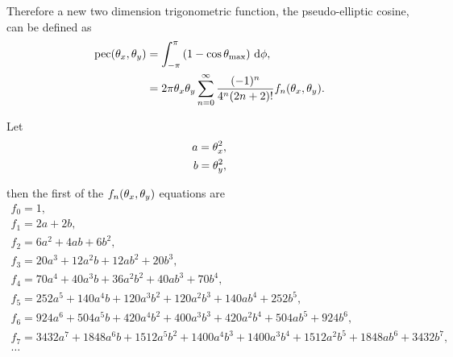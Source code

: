 Therefore a new two dimension trigonometric function, the pseudo-elliptic cosine, can be defined as
\begin{subequations}
\begin{align}
    \operatorname{pec}(\theta_x, \theta_y)
        &= \int_{-\pi}^{\pi} \left( 1 - \cos\theta_\textrm{max} \right) \,\mathrm{d}\phi , \\
        &= 2\pi \theta_x \theta_y \sum_{n=0}^\infty \frac{(-1)^n}{4^n(2n+2)!} f_n(\theta_x, \theta_y) .
\end{align}
\end{subequations}

Let
\begin{align}
    a = \theta_x^2, \nonumber \\
    b = \theta_y^2,
\end{align}

then the first of the $f_n(\theta_x, \theta_y)$ equations are
\begin{gather}
    f_0 = 1 , \nonumber \\
    f_1 = 2a + 2b , \nonumber \\
    f_2 = 6a^2 + 4ab + 6b^2 , \nonumber \\
    f_3 = 20a^3 + 12a^2b + 12ab^2 + 20b^3 , \nonumber \\
    f_4 = 70a^4 + 40a^3b + 36a^2b^2 + 40ab^3 + 70b^4 , \nonumber \\
    f_5 = 252a^5 + 140a^4b + 120a^3b^2 + 120a^2b^3 + 140ab^4 + 252b^5 , \nonumber \\
    f_6 = 924a^6 + 504a^5b + 420a^4b^2 + 400a^3b^3 + 420a^2b^4 + 504ab^5 + 924b^6 , \nonumber \\
    f_7 = 3432a^7 + 1848a^6b + 1512a^5b^2 + 1400a^4b^3 + 1400a^3b^4 + 1512a^2b^5 + 1848ab^6 + 3432b^7 , \nonumber \\
    \dots
\end{gather}

